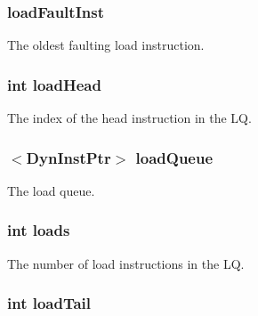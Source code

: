 \label{classOzoneLSQ_a8b4696062ef09ab956804a7a99491853}
\hypertarget{classOzoneLSQ_a7123aa8b10829cc4712dff5454e13978}{
\subsubsection[{loadFaultInst}]{ {\bf loadFaultInst}}}
\label{classOzoneLSQ_a7123aa8b10829cc4712dff5454e13978}
The oldest faulting load instruction. \hypertarget{classOzoneLSQ_ac09af89928d2ef4da4cbdcfce26fa3f5}{
\subsubsection[{loadHead}]{\setlength{\rightskip}{0pt plus 5cm}int {\bf loadHead}}}
\label{classOzoneLSQ_ac09af89928d2ef4da4cbdcfce26fa3f5}
The index of the head instruction in the LQ. \hypertarget{classOzoneLSQ_aa5f3703c5d7c5ce21a497352b94c7465}{
\subsubsection[{loadQueue}]{$<${\bf DynInstPtr}$>$ {\bf loadQueue}}}
\label{classOzoneLSQ_aa5f3703c5d7c5ce21a497352b94c7465}
The load queue. \hypertarget{classOzoneLSQ_a867971f18e464abd16193e069c64a8ad}{
\subsubsection[{loads}]{\setlength{\rightskip}{0pt plus 5cm}int {\bf loads}}}
\label{classOzoneLSQ_a867971f18e464abd16193e069c64a8ad}
The number of load instructions in the LQ. \hypertarget{classOzoneLSQ_a973a489225da164cc85e690f13c86841}{
\subsubsection[{loadTail}]{\setlength{\rightskip}{0pt plus 5cm}int {\bf loadTail}}}
